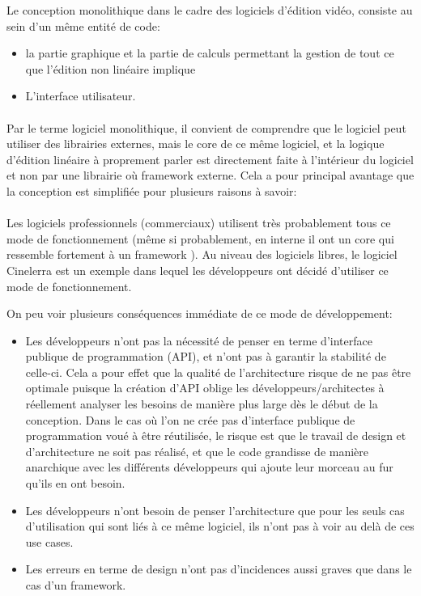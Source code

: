 Le conception monolithique dans le cadre des logiciels d'édition vidéo,
consiste au sein d'un même entité de code:

\begin{itemize} \setlength{\itemsep}{2mm}
  \item { la partie graphique et la partie de calculs
    permettant la gestion de tout ce que l'édition non linéaire
    implique}
  \item {L'interface utilisateur.}
\end {itemize}

\paragraph{}

Par le terme logiciel monolithique, il convient de comprendre que le
logiciel peut utiliser des librairies externes, mais le core de ce même
logiciel, et la logique d'édition linéaire à proprement parler est
directement faite à l'intérieur du logiciel et non par une librairie
où framework  externe. Cela a pour principal avantage que la conception
est simplifiée pour plusieurs raisons à savoir:

\paragraph{}

Les logiciels professionnels (commerciaux) utilisent très probablement
tous ce mode de fonctionnement (même si probablement, en interne il
ont un core qui ressemble fortement à un framework ). Au niveau des
logiciels libres, le logiciel Cinelerra est un exemple dans lequel les
développeurs ont décidé d'utiliser ce mode de fonctionnement.

On peu voir plusieurs conséquences immédiate de ce mode de
développement:

\begin{itemize} \setlength{\itemsep}{2mm}
  \item {Les développeurs n'ont pas la nécessité de penser
    en terme d'interface publique de programmation (API), et
    n'ont pas à garantir la stabilité de celle-ci. Cela a pour effet que
    la qualité de l'architecture risque de ne pas être optimale puisque
    la création d'API oblige les développeurs/architectes
    à réellement analyser les besoins de manière plus large dès le
    début de la conception. Dans le cas où l'on ne crée pas d'interface
    publique de programmation voué à être réutilisée, le risque est
    que le travail de design et d'architecture ne soit pas réalisé,
    et que le code grandisse de manière anarchique avec les différents
    développeurs qui ajoute leur morceau au fur qu'ils en ont besoin.}
  \item {Les développeurs n'ont besoin de penser l'architecture que pour
    les seuls cas d'utilisation qui sont liés à ce même logiciel,
    ils n'ont pas à voir au delà de ces use cases.}
  \item {Les erreurs en terme de design n'ont pas d'incidences aussi
    graves que dans le cas d'un framework.}
\end {itemize}


